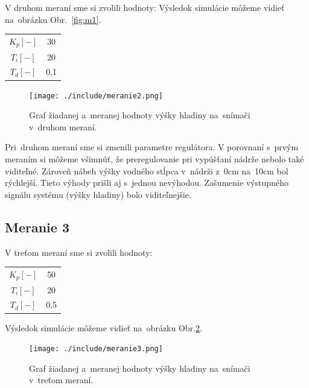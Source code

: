 \documentclass{article}
\begin{document}
V druhom meraní sme si zvolili hodnoty:
Výsledok simulácie môžeme vidieť na~obrázku Obr.~\ref{fig:m1}.

\begin{center}
\begin{tabular}{ |c|c| }
 \hline
 $K_p [-]$ & 30 \\
 $T_i [-]$ & 20 \\
 $T_d [-]$ & 0,1 \\
 \hline
\end{tabular}
\end{center}

\begin{figure}[!htbp]
	\begin{center}
		\texttt{[image: ./include/meranie2.png]}
	\end{center}
	\caption{Graf žiadanej a~meranej hodnoty výšky hladiny na~snímači v~druhom meraní.}
	\label{fig:m2}
\end{figure}

Pri~druhom meraní sme si zmenili parametre regulátora. V porovnaní s~prvým meraním si môžeme všimnúť,
že preregulovanie pri vypúšťaní nádrže nebolo také viditeľné. Zároveň nábeh výšky vodného stĺpca v~nádrži
z~0cm na~10cm bol rýchlejší. Tieto výhody prišli aj s~jednou nevýhodou. Zašumenie výstupného signálu
systému (výšky hladiny) bolo viditeľnejšie.

\clearpage

\subsection{Meranie 3}
\label{sec:meranie3}

V treťom meraní sme si zvolili hodnoty:

\begin{center}
\begin{tabular}{ |c|c| }
 \hline
 $K_p [-]$ & 50 \\
 $T_i [-]$ & 20 \\
 $T_d [-]$ & 0,5 \\
 \hline
\end{tabular}
\end{center}

Výsledok simulácie môžeme vidieť na~obrázku Obr.\ref{fig:m3}.

\begin{figure}[!htbp]
	\begin{center}
		\texttt{[image: ./include/meranie3.png]}
	\end{center}
	\caption{Graf žiadanej a~meranej hodnoty výšky hladiny na~snímači v~treťom meraní.}
	\label{fig:m3}
\end{figure}
\end{document}
